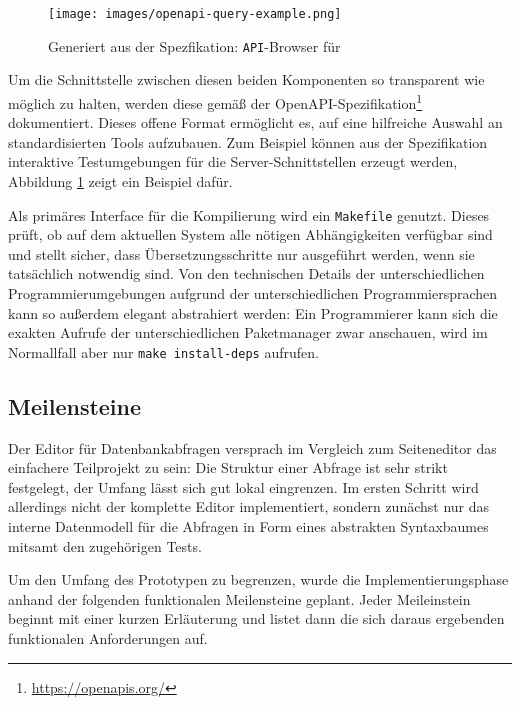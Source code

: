 \begin{figure}[p]
  \centering \texttt{[image: images/openapi-query-example.png]}
  \caption{Generiert aus der Spezfikation: \texttt{API}-Browser für \idename{}}
  \label{fig:openapi-query-example}
\end{figure}

Um die Schnittstelle zwischen diesen beiden Komponenten so transparent wie möglich zu halten, werden diese gemäß der OpenAPI-Spezifikation\footnote{\url{https://openapis.org/}} dokumentiert. Dieses offene Format ermöglicht es, auf eine hilfreiche Auswahl an standardisierten Tools aufzubauen. Zum Beispiel können aus der Spezifikation interaktive Testumgebungen für die Server-Schnittstellen erzeugt werden, Abbildung \ref{fig:openapi-query-example} zeigt ein Beispiel dafür.

Als primäres Interface für die Kompilierung wird ein \texttt{Makefile} genutzt. Dieses prüft, ob auf dem aktuellen System alle nötigen Abhängigkeiten verfügbar sind und stellt sicher, dass Übersetzungsschritte nur ausgeführt werden, wenn sie tatsächlich notwendig sind. Von den technischen Details der unterschiedlichen Programmierumgebungen aufgrund der unterschiedlichen Programmiersprachen kann so außerdem elegant abstrahiert werden: Ein Programmierer kann sich die exakten Aufrufe der unterschiedlichen Paketmanager zwar anschauen, wird im Normallfall aber nur \texttt{make install-deps} aufrufen.

\subsection{Meilensteine}
\label{sec:implementation-roadmap}

Der Editor für Datenbankabfragen versprach im Vergleich zum Seiteneditor das einfachere Teilprojekt zu sein: Die Struktur einer Abfrage ist sehr strikt festgelegt, der Umfang lässt sich gut lokal eingrenzen. Im ersten Schritt wird allerdings nicht der komplette Editor implementiert, sondern zunächst nur das interne Datenmodell für die Abfragen in Form eines abstrakten Syntaxbaumes mitsamt den zugehörigen Tests.

Um den Umfang des Prototypen zu begrenzen, wurde die Implementierungsphase anhand der folgenden funktionalen Meilensteine geplant. Jeder Meileinstein beginnt mit einer kurzen Erläuterung und listet dann die sich daraus ergebenden funktionalen Anforderungen auf.

